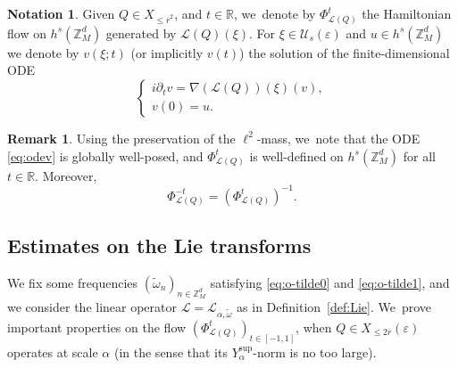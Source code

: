 \documentclass[JEP,XML,SOM,Unicode,published]{cedram}
\theoremstyle{plain}
\theoremstyle{definition}
\newtheorem{notation}[theorem]{Notation}
\newtheorem{remark}[theorem]{Remark}
\newcommand{\Z}{\mathbb{Z}}
\newcommand{\R}{\mathbb{R}}
\newcommand{\1}{\mathbf{1}}
\newcommand{\Ysup}[1]{Y_{#1}^{\mathrm{sup}}}
\let\epsilon\varepsilon
\begin{document}
\begin{notation}
Given $Q\in X_{\leq\overline{r}^{2}}$, and $t\in\R$, we~denote by $\Phi_{\mathcal{L}(Q)}^{t}$ the Hamiltonian flow on $h^s(\Z_{M}^{d})$ generated by $\mathcal{L}(Q)(\xi)$. For $\xi\in\mathcal{U}_{s}(\epsilon)$ and $u\in h^{s}(\Z_{M}^{d})$ we denote by $v(\xi;t)$ (or implicitly $v(t)$) the solution of the finite-dimensional ODE
\begin{equation}
\label{eq:odev}
\begin{cases}
i\partial_t v = \nabla(\mathcal{L}(Q))(\xi)(v),\\
v(0) = u.
\end{cases}
\end{equation}
\end{notation}

\begin{remark}
Using the preservation of the $\ell^{2}$-mass, we~note that the ODE \eqref{eq:odev} is globally well-posed, and $\Phi_{\mathcal{L}(Q)}^{t}$ is well-defined on $h^s(\Z_{M}^{d})$ for all $t\in\R$. Moreover,
\[
\Phi_{\mathcal{L}(Q)}^{-t} = (\Phi_{\mathcal{L}(Q)}^{t})^{-1}.
\]
\end{remark}

\subsection{Estimates on the Lie transforms}
\label{sec:lie-prop}
We fix some frequencies $(\widetilde{\omega}_{n})_{n\in\Z_{M}^{d}}$ satisfying \eqref{eq:o-tilde0} and \eqref{eq:o-tilde1}, and we consider the linear operator $\mathcal{L}=\mathcal{L}_{\alpha,\widetilde{\omega}}$ as in Definition~\ref{def:Lie}. We~prove important properties on the flow $(\Phi_{\mathcal{L}(Q)}^t)_{t\in[-1,1]}$, when $Q\in X_{\leq2\overline{r}}(\epsilon)$ operates at scale $\alpha$ (in the sense that its $\Ysup{\alpha}$-norm is no too large).
\end{document}
